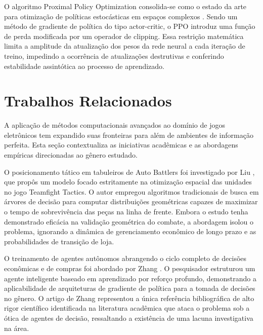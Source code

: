 \documentclass[12pt]{article}
\begin{document}
O algoritmo Proximal Policy Optimization consolida-se como o estado da arte para otimização de políticas estocásticas em espaços complexos \cite{schulman2017}. Sendo um método de gradiente de política do tipo actor-critic, o PPO introduz uma função de perda modificada por um operador de clipping. Essa restrição matemática limita a amplitude da atualização dos pesos da rede neural a cada iteração de treino, impedindo a ocorrência de atualizações destrutivas e conferindo estabilidade assintótica ao processo de aprendizado.

\section{Trabalhos Relacionados} \label{sec:relacionados}

A aplicação de métodos computacionais avançados ao domínio de jogos eletrônicos tem expandido suas fronteiras para além de ambientes de informação perfeita. Esta seção contextualiza as iniciativas acadêmicas e as abordagens empíricas direcionadas ao gênero estudado.

O posicionamento tático em tabuleiros de Auto Battlers foi investigado por Liu \cite{liu2022}, que propôs um modelo focado estritamente na otimização espacial das unidades no jogo Teamfight Tactics. O autor empregou algoritmos tradicionais de busca em árvores de decisão para computar distribuições geométricas capazes de maximizar o tempo de sobrevivência das peças na linha de frente. Embora o estudo tenha demonstrado eficácia na validação geométrica do combate, a abordagem isolou o problema, ignorando a dinâmica de gerenciamento econômico de longo prazo e as probabilidades de transição de loja.

O treinamento de agentes autônomos abrangendo o ciclo completo de decisões econômicas e de compras foi abordado por Zhang \cite{zhang2024}. O pesquisador estruturou um agente inteligente baseado em aprendizado por reforço profundo, demonstrando a aplicabilidade de arquiteturas de gradiente de política para a tomada de decisões no gênero. O artigo de Zhang representou a única referência bibliográfica de alto rigor científico identificada na literatura acadêmica que ataca o problema sob a ótica de agentes de decisão, ressaltando a existência de uma lacuna investigativa na área.
\end{document}
